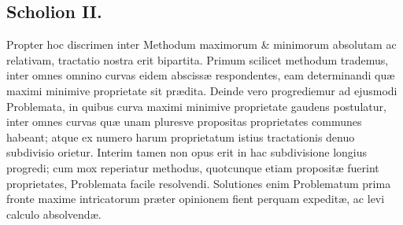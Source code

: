 \subsection*{Scholion II.}
Propter hoc discrimen inter Methodum maximorum \&
minimorum absolutam ac relativam, tractatio nostra erit bipartita. Primum
scilicet methodum trademus, inter omnes omnino curvas eidem abscissæ
respondentes, eam determinandi quæ maximi minimive proprietate sit prædita.
Deinde vero progrediemur ad ejusmodi Problemata, in quibus curva maximi
minimive  proprietate gaudens postulatur, inter omnes curvas quæ unam
pluresve propositas proprietates communes habeant; atque ex numero harum
proprietatum istius tractationis denuo subdivisio orietur. Interim tamen
non opus erit in hac subdivisione longius progredi; cum mox reperiatur
methodus, quotcunque etiam propositæ fuerint proprietates, Problemata facile
resolvendi. Solutiones enim Problematum prima fronte maxime intricatorum
præter opinionem fient perquam expeditæ, ac levi calculo absolvendæ.
